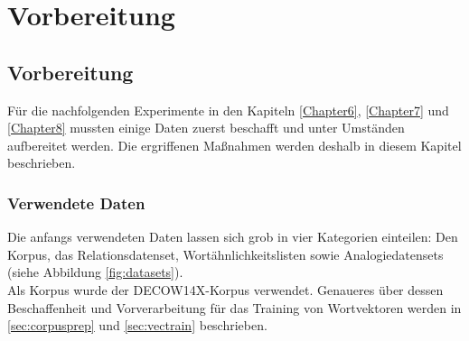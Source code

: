 
\chapter{Vorbereitung} %

\label{Chapter4} %


\section{Vorbereitung}

  Für die nachfolgenden Experimente in den Kapiteln \ref{Chapter6}, \ref{Chapter7} und \ref{Chapter8}
  mussten einige Daten zuerst beschafft und unter Umständen aufbereitet werden. Die ergriffenen Maßnahmen werden
  deshalb in diesem Kapitel beschrieben.

  \subsection{Verwendete Daten}

  Die anfangs verwendeten Daten lassen sich grob in vier Kategorien einteilen: Den Korpus, das Relationsdatenset,
  Wortähnlichkeitslisten sowie Analogiedatensets (siehe Abbildung \ref{fig:datasets}).\\
  Als Korpus wurde der \textsc{DECOW14X}-Korpus verwendet. Genaueres über dessen Beschaffenheit und Vorverarbeitung für das
  Training von Wortvektoren werden in \ref{sec:corpusprep} und \ref{sec:vectrain} beschrieben.


